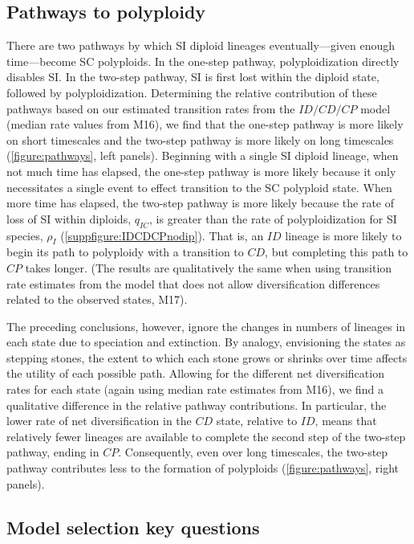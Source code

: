 \subsection{Pathways to polyploidy}
There are two pathways by which SI diploid lineages eventually---given enough time---become SC polyploids.
In the one-step pathway, polyploidization directly disables SI.
In the two-step pathway, SI is first lost within the diploid state, followed by polyploidization.
Determining the relative contribution of these pathways based on our estimated transition rates from the $ID/CD/CP$ model (median rate values from M16), we find that the one-step pathway is more likely on short timescales and the two-step pathway is more likely on long timescales (\cref{figure:pathways}, left panels).
Beginning with a single SI diploid lineage, when not much time has elapsed, the one-step pathway is more likely because it only necessitates a single event to effect transition to the SC polyploid state.
When more time has elapsed, the two-step pathway is more likely because the rate of loss of SI within diploids, $q_{IC}$, is greater than the rate of polyploidization for SI species, $\rho_I$ (\cref{suppfigure:IDCDCPnodip}).
That is, an $ID$ lineage is more likely to begin its path to polyploidy with a transition to $CD$, but completing this path to $CP$ takes longer.
(The results are qualitatively the same when using transition rate estimates from the model that does not allow diversification differences related to the observed states, M17).

The preceding conclusions, however, ignore the changes in numbers of lineages in each state due to speciation and extinction.
By analogy, envisioning the states as stepping stones, the extent to which each stone grows or shrinks over time affects the utility of each possible path.
Allowing for the different net diversification rates for each state (again using median rate estimates from M16), we find a qualitative difference in the relative pathway contributions.
In particular, the lower rate of net diversification in the $CD$ state, relative to $ID$, means that relatively fewer lineages are available to complete the second step of the two-step pathway, ending in $CP$.
Consequently, even over long timescales, the two-step pathway contributes less to the formation of polyploids (\cref{figure:pathways}, right panels).

\subsection{Model selection key questions}
